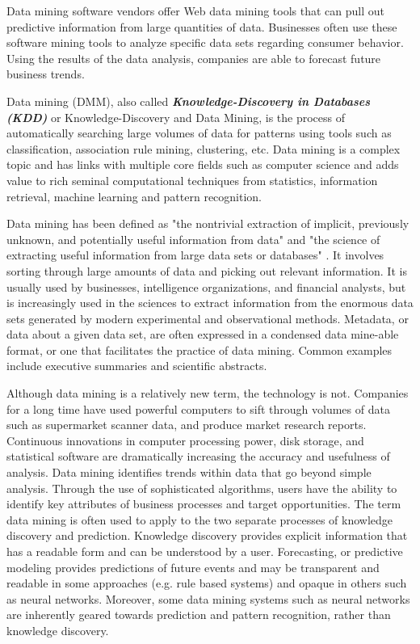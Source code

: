 Data mining software vendors offer Web data mining tools that can pull out predictive information from large quantities of data. Businesses often use these software mining tools to analyze specific data sets regarding consumer behavior. Using the results of the data analysis, companies are able to forecast future business trends.

 

Data mining (DMM), also called \textbf{\textit{Knowledge-Discovery in Databases (KDD) }}or Knowledge-Discovery and Data Mining, is the process of automatically searching large volumes of data for patterns using tools such as classification, association rule mining, clustering, etc. Data mining is a complex topic and has links with multiple core fields such as computer science and adds value to rich seminal computational techniques from statistics, information retrieval, machine learning and pattern recognition. 


Data mining has been defined as "the nontrivial extraction of implicit, previously unknown, and potentially useful information from data"  and "the science of extracting useful information from large data sets or databases" . It involves sorting through large amounts of data and picking out relevant information. It is usually used by businesses, intelligence organizations, and financial analysts, but is increasingly used in the sciences to extract information from the enormous data sets generated by modern experimental and observational methods. Metadata, or data about a given data set, are often expressed in a condensed data mine-able format, or one that facilitates the practice of data mining. Common examples include executive summaries and scientific abstracts. 


Although data mining is a relatively new term, the technology is not. Companies for a long time have used powerful computers to sift through volumes of data such as supermarket scanner data, and produce market research reports. Continuous innovations in computer processing power, disk storage, and statistical software are dramatically increasing the accuracy and usefulness of analysis. Data mining identifies trends within data that go beyond simple analysis. Through the use of sophisticated algorithms, users have the ability to identify key attributes of business processes and target opportunities. The term data mining is often used to apply to the two separate processes of knowledge discovery and prediction. Knowledge discovery provides explicit information that has a readable form and can be understood by a user. Forecasting, or predictive modeling provides predictions of future events and may be transparent and readable in some approaches (e.g. rule based systems) and opaque in others such as neural networks. Moreover, some data mining systems such as neural networks are inherently geared towards prediction and pattern recognition, rather than knowledge discovery. 



